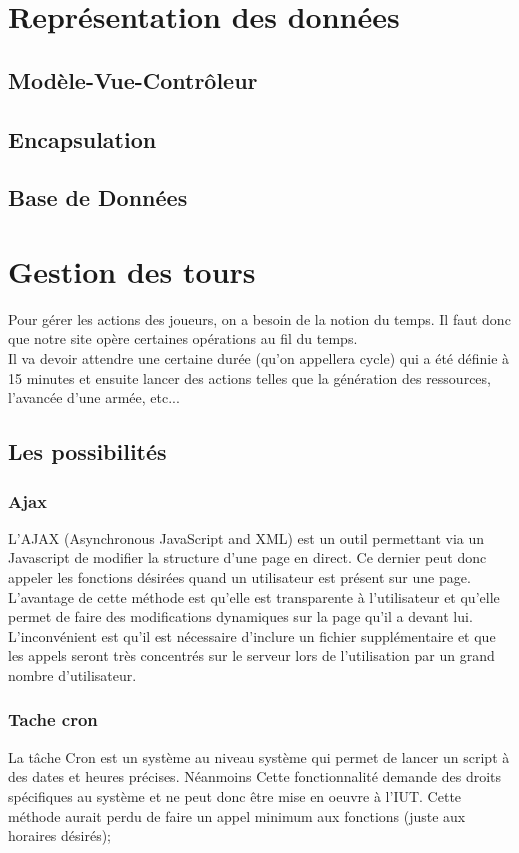 \documentclass[11pt,a4paper]{article}
\begin{document}
\newpage\section{Représentation des données}
\subsection{Modèle-Vue-Contrôleur}
\subsection{Encapsulation}
\subsection{Base de Données}

\newpage\section{Gestion des tours}
Pour gérer les actions des joueurs, on a besoin de la notion du temps. Il faut donc que notre site opère certaines opérations au fil du temps. \\
Il va devoir attendre une certaine durée (qu'on appellera cycle) qui a été définie à 15 minutes et ensuite lancer des actions telles que la génération des ressources, l'avancée d'une armée, etc...\\
\subsection{Les possibilités}
\subsubsection{Ajax}
L'AJAX (Asynchronous JavaScript and XML) est un outil permettant via un Javascript de modifier la structure d'une page en direct. 
Ce dernier peut donc appeler les fonctions désirées quand un utilisateur est présent sur une page.\\
L'avantage de cette méthode est qu'elle est transparente à l'utilisateur et qu'elle permet de faire des modifications dynamiques sur la page qu'il a devant lui. \\
L'inconvénient est qu'il est nécessaire d'inclure un fichier supplémentaire et que les appels seront très concentrés sur le serveur lors de l'utilisation par un grand nombre d'utilisateur.\\
\subsubsection{Tache cron}
La tâche Cron est un système au niveau système qui permet de lancer un script à des dates et heures précises. Néanmoins Cette fonctionnalité demande des droits spécifiques au système et ne peut donc être mise en oeuvre à l'IUT. Cette méthode aurait perdu de faire un appel minimum aux fonctions (juste aux horaires désirés);
\end{document}
